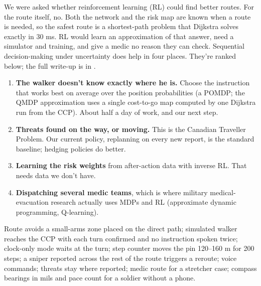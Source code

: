We were asked whether reinforcement learning (RL) could find better routes. For the route itself, no. Both the
network and the risk map are known when a route is needed, so the safest route is a shortest-path problem that
Dijkstra solves exactly in 30 ms. RL would learn an approximation of that answer, need a simulator and training,
and give a medic no reason they can check. Sequential decision-making under uncertainty does help in four places.
They're ranked below; the full write-up is in .
\begin{enumerate}
  \item \textbf{The walker doesn't know exactly where he is.} Choose the instruction that works best on average over
        the position probabilities (a POMDP; the QMDP approximation uses a single cost-to-go map computed by one
        Dijkstra run from the CCP). About half a day of work, and our next step.
  \item \textbf{Threats found on the way, or moving.} This is the Canadian Traveller Problem. Our current policy,
        replanning on every new report, is the standard baseline; hedging policies do better.
  \item \textbf{Learning the risk weights} from after-action data with inverse RL. That needs data we don't have.
  \item \textbf{Dispatching several medic teams}, which is where military medical-evacuation research actually uses
        MDPs and RL (approximate dynamic programming, Q-learning).
\end{enumerate}

\begin{keyresult}
Route avoids a small-arms zone placed on the direct path; simulated walker reaches the CCP with each turn confirmed and no
instruction spoken twice; clock-only mode waits at the turn; step counter moves the pin 120--160 m for 200 steps; a sniper
reported across the rest of the route triggers a reroute; voice commands; threats stay where reported; medic route for a
stretcher case; compass bearings in mils and pace count for a soldier without a phone.
\end{keyresult}

